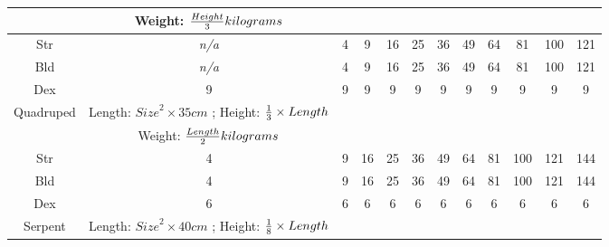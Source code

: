 \documentclass[twoside]{book}
\begin{document}
\begin{table}[htb]
\begin{center}
\begin{tabular}{|c|c|c|c|c|c|c|c|c|c|c|c|}
\hline

& Weight: \begin{math}    {{
                     Height}\over{ 3 }}  kilograms
                        \end{math}
                  \\

\hline

 Str &
                    \textit{n/a}
                  & 4 & 9 & 16 & 25 & 36 & 49 & 64 & 81 & 100 & 121 \\

\hline

 Bld &
                    \textit{n/a}
                  & 4 & 9 & 16 & 25 & 36 & 49 & 64 & 81 & 100 & 121 \\

\hline

 Dex & 9 & 9 & 9 & 9 & 9 & 9 & 9 & 9 & 9 & 9 & 9 \\

\hline

 Quadruped &  Length: \begin{math}  
                        {Size}^{ 2 }   \times     35 
                           cm  \end{math} ; Height: \begin{math} 
                           {{ 1 }\over{ 3 }}  
                           \times    Length  \end{math}
                  \\

\hline

&  Weight: \begin{math}    {{
                     Length}\over{ 2 }}  kilograms
                        \end{math}
                  \\

\hline

 Str & 4 & 9 & 16 & 25 & 36 & 49 & 64 & 81 & 100 & 121 & 144 \\

\hline

 Bld & 4 & 9 & 16 & 25 & 36 & 49 & 64 & 81 & 100 & 121 & 144 \\

\hline

 Dex & 6 & 6 & 6 & 6 & 6 & 6 & 6 & 6 & 6 & 6 & 6 \\

\hline

 Serpent &  Length: \begin{math}  
                        {Size}^{ 2 }   \times   40 cm
                            \end{math} ; Height: \begin{math} 
                           {{ 1 }\over{ 8 }}  
                           \times  Length  \end{math}
                  \\


\end{tabular}
\end{center}
\end{table}
\end{document}
